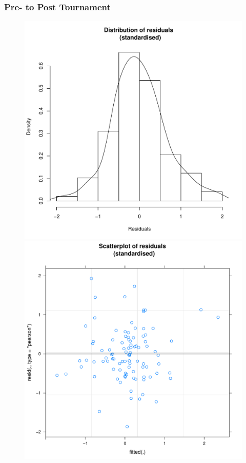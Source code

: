 \begin{CJK}{UTF8}{gbsn}
 \subsubsection{Pre- to Post Tournament\label{app8:211a}}

 

 \begin{figure}[htbp]
   \includegraphics[scale =.4]{images/MLM21aHist.pdf}
   \includegraphics[scale =.4]{images/MLM21aScatter.pdf}

\end{figure}
\end{CJK}
